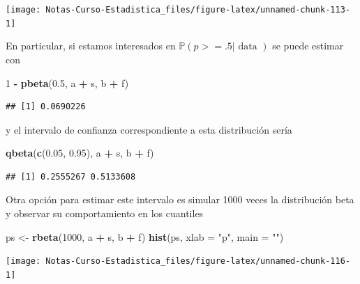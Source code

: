 \documentclass[
  12pt,
]{book}
\newenvironment{Shaded}{\begin{snugshade}}{\end{snugshade}}
\newcommand{\DataTypeTok}[1]{\textcolor[rgb]{0.13,0.29,0.53}{#1}}
\newcommand{\DecValTok}[1]{\textcolor[rgb]{0.00,0.00,0.81}{#1}}
\newcommand{\FloatTok}[1]{\textcolor[rgb]{0.00,0.00,0.81}{#1}}
\newcommand{\KeywordTok}[1]{\textcolor[rgb]{0.13,0.29,0.53}{\textbf{#1}}}
\newcommand{\NormalTok}[1]{#1}
\newcommand{\OperatorTok}[1]{\textcolor[rgb]{0.81,0.36,0.00}{\textbf{#1}}}
\newcommand{\StringTok}[1]{\textcolor[rgb]{0.31,0.60,0.02}{#1}}
\theoremstyle{definition}
\theoremstyle{definition}
\theoremstyle{definition}
\theoremstyle{remark}
\begin{document}
\begin{center}\texttt{[image: Notas-Curso-Estadistica\_files/figure-latex/unnamed-chunk-113-1]} \end{center}

En particular, si estamos interesados en \(\mathbb{P}(p>=.5 | \text {  data })\) se puede estimar con

\begin{Shaded}
\begin{Highlighting}[]
\DecValTok{1} \OperatorTok{-}\StringTok{ }\KeywordTok{pbeta}\NormalTok{(}\FloatTok{0.5}\NormalTok{, a }\OperatorTok{+}\StringTok{ }\NormalTok{s, b }\OperatorTok{+}\StringTok{ }\NormalTok{f)}
\end{Highlighting}
\end{Shaded}

\begin{verbatim}
## [1] 0.0690226
\end{verbatim}

y el intervalo de confianza correspondiente a esta distribución sería

\begin{Shaded}
\begin{Highlighting}[]
\KeywordTok{qbeta}\NormalTok{(}\KeywordTok{c}\NormalTok{(}\FloatTok{0.05}\NormalTok{, }\FloatTok{0.95}\NormalTok{), a }\OperatorTok{+}\StringTok{ }\NormalTok{s, b }\OperatorTok{+}\StringTok{ }\NormalTok{f)}
\end{Highlighting}
\end{Shaded}

\begin{verbatim}
## [1] 0.2555267 0.5133608
\end{verbatim}

Otra opción para estimar este intervalo es simular 1000 veces la
distribución beta y observar su comportamiento en los cuantiles

\begin{Shaded}
\begin{Highlighting}[]
\NormalTok{ps <-}\StringTok{ }\KeywordTok{rbeta}\NormalTok{(}\DecValTok{1000}\NormalTok{, a }\OperatorTok{+}\StringTok{ }\NormalTok{s, b }\OperatorTok{+}\StringTok{ }\NormalTok{f)}
\KeywordTok{hist}\NormalTok{(ps, }\DataTypeTok{xlab =} \StringTok{"p"}\NormalTok{, }\DataTypeTok{main =} \StringTok{""}\NormalTok{)}
\end{Highlighting}
\end{Shaded}

\begin{center}\texttt{[image: Notas-Curso-Estadistica\_files/figure-latex/unnamed-chunk-116-1]} \end{center}
\end{document}
